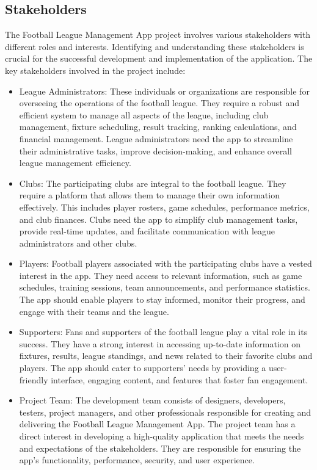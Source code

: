 \documentclass[12pt]{article}
\begin{document}
\subsection{Stakeholders}
The Football League Management App project involves various stakeholders with different roles and interests. Identifying and understanding these stakeholders is crucial for the successful development and implementation of the application. The key stakeholders involved in the project include:
\begin{itemize}
    \item League Administrators: These individuals or organizations are responsible for overseeing the operations of the football league. They require a robust and efficient system to manage all aspects of the league, including club management, fixture scheduling, result tracking, ranking calculations, and financial management. League administrators need the app to streamline their administrative tasks, improve decision-making, and enhance overall league management efficiency.

    \item Clubs: The participating clubs are integral to the football league. They require a platform that allows them to manage their own information effectively. This includes player rosters, game schedules, performance metrics, and club finances. Clubs need the app to simplify club management tasks, provide real-time updates, and facilitate communication with league administrators and other clubs.

    \item Players: Football players associated with the participating clubs have a vested interest in the app. They need access to relevant information, such as game schedules, training sessions, team announcements, and performance statistics. The app should enable players to stay informed, monitor their progress, and engage with their teams and the league.

    \item Supporters: Fans and supporters of the football league play a vital role in its success. They have a strong interest in accessing up-to-date information on fixtures, results, league standings, and news related to their favorite clubs and players. The app should cater to supporters' needs by providing a user-friendly interface, engaging content, and features that foster fan engagement.

    \item Project Team: The development team consists of designers, developers, testers, project managers, and other professionals responsible for creating and delivering the Football League Management App. The project team has a direct interest in developing a high-quality application that meets the needs and expectations of the stakeholders. They are responsible for ensuring the app's functionality, performance, security, and user experience.


\end{itemize}
\end{document}
